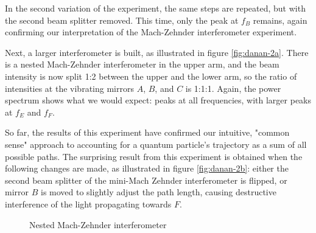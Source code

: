 \documentclass{article}
\begin{document}
In the second variation of the experiment, the same steps are repeated, but 
with the second beam splitter removed. This time, only the peak at $f_B$ 
remains, again confirming our interpretation of the Mach-Zehnder interferometer 
experiment. 

Next, a larger interferometer is built, as illustrated in figure 
\ref{fig:danan-2a}. There is a nested Mach-Zehnder interferometer in the upper 
arm, and the beam intensity is now split 1:2 between the upper and the lower 
arm, so the ratio of intensities at the vibrating mirrors $A$, $B$, and $C$ is 
1:1:1.  Again, the power spectrum shows what we would expect: peaks at all 
frequencies, with larger peaks at $f_E$ and $f_F$. 

So far, the results of this experiment have confirmed our intuitive, "common 
sense" approach to accounting for a quantum particle's trajectory as a sum of 
all possible paths. The surprising result from this experiment is obtained when 
the following changes are made, as illustrated in figure \ref{fig:danan-2b}:
either the second beam splitter of the mini-Mach Zehnder interferometer is 
flipped, or mirror $B$ is moved to slightly adjust the path length, causing 
destructive interference of the light propagating towards $F$. 

\begin{figure}
	\subfloat[]{\label{fig:danan-2a}}
	\subfloat[]{\label{fig:danan-2b}}
	\newline
	\hspace*{\fill}
	\subfloat[]{\label{fig:danan-2c}}
	\hspace*{\fill}
	\caption{Nested Mach-Zehnder interferometer}
	\label{fig:danan}
\end{figure}
\end{document}
